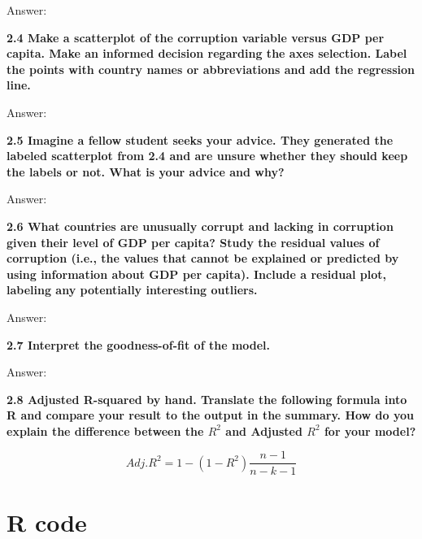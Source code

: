 \documentclass[
]{article}
\begin{document}
Answer:

\textbf{2.4 Make a scatterplot of the corruption variable versus GDP per
capita. Make an informed decision regarding the axes selection. Label
the points with country names or abbreviations and add the regression
line.}

Answer:

\textbf{2.5 Imagine a fellow student seeks your advice. They generated
the labeled scatterplot from 2.4 and are unsure whether they should keep
the labels or not. What is your advice and why?}

Answer:

\textbf{2.6 What countries are unusually corrupt and lacking in
corruption given their level of GDP per capita? Study the residual
values of corruption (i.e., the values that cannot be explained or
predicted by using information about GDP per capita). Include a residual
plot, labeling any potentially interesting outliers.}

Answer:

\textbf{2.7 Interpret the goodness-of-fit of the model.}

Answer:

\textbf{2.8 Adjusted R-squared by hand. Translate the following formula
into R and compare your result to the output in the summary. How do you
explain the difference between the \(R^2\) and Adjusted \(R^2\) for your
model?}

\[Adj.R^2=1 - (1 - R^2)\frac{n-1}{n-k-1}\]

\hypertarget{r-code}{%
\section{R code}\label{r-code}}
\end{document}
